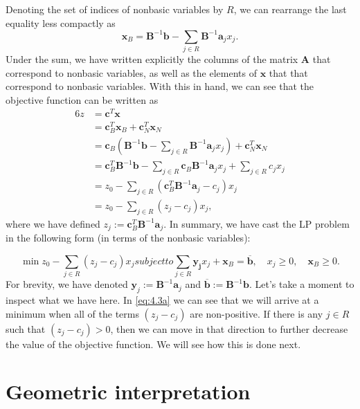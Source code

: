 \documentclass[12pt,english]{article}
\begin{document}
Denoting the set of indices of nonbasic variables by $R$, we can rearrange the last equality less compactly as
$$
\mathbf{x}_B = \mathbf{B}^{-1}\mathbf{b} - \sum_{j \in R} \mathbf{B}^{-1} \mathbf{a}_j x_j.
$$
Under the sum, we have written explicitly the columns of the matrix $\mathbf{A}$ that correspond to nonbasic variables, as well as the elements of $\mathbf{x}$ that that correspond to nonbasic variables.  With this in hand, we can see that the objective function can be written as
\begin{alignat*}{6}
z 		&= \mathbf{c}^T \mathbf{x} \\
		&= \mathbf{c}_B^T\mathbf{x}_B + \mathbf{c}_N^T \mathbf{x}_N \\
		&= \mathbf{c}_B \left( \mathbf{B}^{-1} \mathbf{b} - \sum_{j \in R} \mathbf{B}^{-1} \mathbf{a}_j x_j\right) + \mathbf{c}_N^T \mathbf{x}_N \\
		&= \mathbf{c}_B^T \mathbf{B}^{-1}\mathbf{b} - \sum_{j \in R} \mathbf{c}_B \mathbf{B}^{-1} \mathbf{a}_j x_j + \sum_{j \in R} c_j x_j \\
		&= z_0 - \sum_{j \in R} (\mathbf{c}_B^T \mathbf{B}^{-1} \mathbf{a}_j - c_j) x_j \\
		&= z_0 - \sum_{j \in R} (z_j -c_j)x_j, 
\end{alignat*}
where we have defined $z_j := \mathbf{c}_B^T \mathbf{B}^{-1} \mathbf{a}_j $.  In summary, we have cast the LP problem in the following form (in terms of the nonbasic variables):

\begin{subequations}\label{eq:4.3a}
\begin{equation}
\min z_0 - \sum_{j \in R} (z_j - c_j) x_j
\end{equation}
subject to
\begin{equation}\label{eq:4.3b}
\sum_{j \in R} \mathbf{y_j}x_j + \mathbf{x}_B = \overline{\mathbf{b}}, \quad x_j \geq 0, \quad \mathbf{x}_B \geq 0.
\end{equation}
\end{subequations}
For brevity, we have denoted $\mathbf{y}_j := \mathbf{B}^{-1} \mathbf{a}_j$ and $\overline{\mathbf{b}}:= \mathbf{B}^{-1}\mathbf{b}$.  Let's take a moment to inspect what we have here.  In \eqref{eq:4.3a} we can see that we will arrive at a minimum when all of the terms $(z_j - c_j)$ are non-positive.  If there is any $j \in R$ such that $(z_j - c_j) >0$, then we can move in that direction to further decrease the value of the objective function.  We will see how this is done next.

\section{Geometric interpretation}
\end{document}
